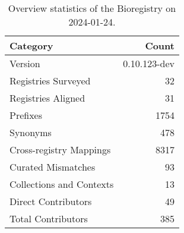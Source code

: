 \begin{table}
\caption{Overview statistics of the Bioregistry on 2024-01-24.}
\label{tab:bioregistry-summary}
\begin{tabular}{lr}
\toprule
Category & Count \\
\midrule
Version & 0.10.123-dev \\
Registries Surveyed & 32 \\
Registries Aligned & 31 \\
Prefixes & 1754 \\
Synonyms & 478 \\
Cross-registry Mappings & 8317 \\
Curated Mismatches & 93 \\
Collections and Contexts & 13 \\
Direct Contributors & 49 \\
Total Contributors & 385 \\
\bottomrule
\end{tabular}
\end{table}
